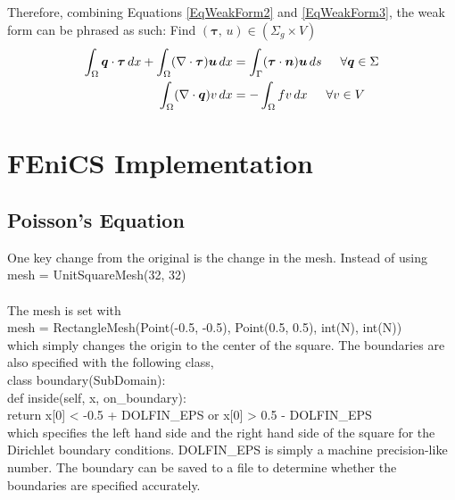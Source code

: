 \documentclass[12pt,3p]{article}
\begin{document}
Therefore, combining Equations \ref{EqWeakForm2} and \ref{EqWeakForm3}, the weak form can be phrased as such: Find $(\bm{\tau}, \, u) \in (\Sigma_g \times V)$
\begin{subequations}\label{EqWeakFormTotal}
\begin{align}
\int_{\Omega} \bm{q} \cdot \bm{\tau} \, dx + \int_{\Omega} (\nabla \cdot \bm{\tau}) \bm{u} \, dx &= \int_{\Gamma} (\bm{\tau} \cdot \bm{n}) \bm{u} \, ds \indent \forall \bm{q} \in \Sigma \\
\int_{\Omega} (\nabla \cdot \bm{q}) v \, dx &= - \int_{\Omega} fv \, d x \indent \forall v \in V
\end{align}
\end{subequations}


\section{FEniCS Implementation}
\vspace{-2ex}

\subsection{Poisson's Equation}
\vspace{-1ex}
One key change from the original is the change in the mesh. Instead of using \\
{\selectfont
mesh = UnitSquareMesh(32, 32) \\ \\
} 
The mesh is set with \\ 
{\selectfont
mesh = RectangleMesh(Point(-0.5, -0.5), Point(0.5, 0.5), int(N), int(N)) \\
} 
which simply changes the origin to the center of the square. The boundaries are also specified with the following class, \\
{\selectfont
class boundary(SubDomain): \\
\indent def inside(self, x, on\_boundary): \\
\indent \indent return x[0] < -0.5 + DOLFIN\_EPS or x[0] > 0.5 - DOLFIN\_EPS \\ 
}
which specifies the left hand side and the right hand side of the square for the Dirichlet boundary conditions. {\selectfont DOLFIN\_EPS } is simply a machine precision-like number. The boundary can be saved to a file to determine whether the boundaries are specified accurately. 
\end{document}
